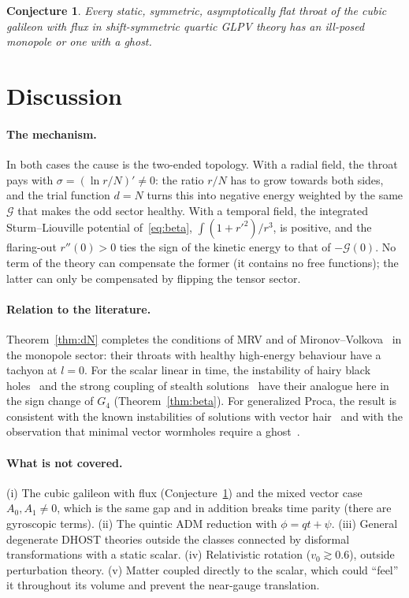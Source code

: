 \documentclass[11pt,a4paper]{article}
\newtheorem{conjecture}[theorem]{Conjecture}
\theoremstyle{remark}
\newcommand{\G}{\mathcal G}
\begin{document}
\begin{conjecture}\label{conj:cubic}
Every static, symmetric, asymptotically flat throat of the cubic galileon with flux in shift-symmetric quartic GLPV theory has an ill-posed monopole or one with a ghost.
\end{conjecture}

\section{Discussion}\label{sec:discussion}

\paragraph{The mechanism.} In both cases the cause is the two-ended topology. With a radial field, the throat pays with $\sigma=(\ln r/N)'\neq0$: the ratio $r/N$ has to grow towards both sides, and the trial function $d=N$ turns this into negative energy weighted by the same $\G$ that makes the odd sector healthy. With a temporal field, the integrated Sturm--Liouville potential of~\eqref{eq:beta}, $\int(1+r'^2)/r^3$, is positive, and the flaring-out $r''(0)>0$ ties the sign of the kinetic energy to that of $-\G(0)$. No term of the theory can compensate the former (it contains no free functions); the latter can only be compensated by flipping the tensor sector.

\paragraph{Relation to the literature.} Theorem~\ref{thm:dN} completes the conditions of MRV and of Mironov--Volkova~\cite{MRV3,MironovVolkova} in the monopole sector: their throats with healthy high-energy behaviour have a tachyon at $l=0$. For the scalar linear in time, the instability of hairy black holes~\cite{OgawaKobayashiSuyama} and the strong coupling of stealth solutions~\cite{deRhamZhang} have their analogue here in the sign change of $G_4$ (Theorem~\ref{thm:beta}). For generalized Proca, the result is consistent with the known instabilities of solutions with vector hair~\cite{HKMT,KaseOdd,DeFeliceCubic,GarciaSaenz} and with the observation that minimal vector wormholes require a ghost~\cite{Ganiyeva}.

\paragraph{What is not covered.} (i) The cubic galileon with flux (Conjecture~\ref{conj:cubic}) and the mixed vector case $A_0,A_1\neq0$, which is the same gap and in addition breaks time parity (there are gyroscopic terms). (ii) The quintic ADM reduction with $\phi=qt+\psi$. (iii) General degenerate DHOST theories outside the classes connected by disformal transformations with a static scalar. (iv) Relativistic rotation ($v_0\gtrsim0.6$), outside perturbation theory. (v) Matter coupled directly to the scalar, which could ``feel'' it throughout its volume and prevent the near-gauge translation.
\end{document}
